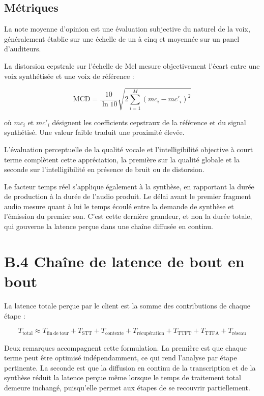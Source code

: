 \subsection*{Métriques}

La note moyenne d'opinion est une évaluation subjective du naturel de la voix, généralement établie sur une échelle de un à cinq et moyennée sur un panel d'auditeurs.

La distorsion cepstrale sur l'échelle de Mel mesure objectivement l'écart entre une voix synthétisée et une voix de référence :

\begin{equation}
\mathrm{MCD} = \frac{10}{\ln 10} \sqrt{2 \sum_{i=1}^{M} \left(mc_i - mc'_i\right)^2}
\end{equation}

où $mc_i$ et $mc'_i$ désignent les coefficients cepstraux de la référence et du signal synthétisé. Une valeur faible traduit une proximité élevée.

L'évaluation perceptuelle de la qualité vocale et l'intelligibilité objective à court terme complètent cette appréciation, la première sur la qualité globale et la seconde sur l'intelligibilité en présence de bruit ou de distorsion.

Le facteur temps réel s'applique également à la synthèse, en rapportant la durée de production à la durée de l'audio produit. Le délai avant le premier fragment audio mesure quant à lui le temps écoulé entre la demande de synthèse et l'émission du premier son. C'est cette dernière grandeur, et non la durée totale, qui gouverne la latence perçue dans une chaîne diffusée en continu.

\section*{B.4 Chaîne de latence de bout en bout}

La latence totale perçue par le client est la somme des contributions de chaque étape :

\begin{equation}
T_{\mathrm{total}} \approx T_{\mathrm{fin\ de\ tour}} + T_{\mathrm{STT}} + T_{\mathrm{contexte}} + T_{\mathrm{récupération}} + T_{\mathrm{TTFT}} + T_{\mathrm{TTFA}} + T_{\mathrm{réseau}}
\end{equation}

Deux remarques accompagnent cette formulation. La première est que chaque terme peut être optimisé indépendamment, ce qui rend l'analyse par étape pertinente. La seconde est que la diffusion en continu de la transcription et de la synthèse réduit la latence perçue même lorsque le temps de traitement total demeure inchangé, puisqu'elle permet aux étapes de se recouvrir partiellement.

